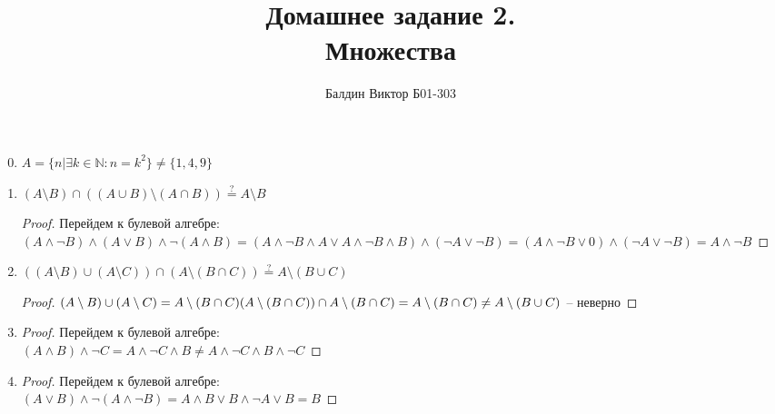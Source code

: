 \documentclass[12pt]{article}
\title{Домашнее задание 2. \\ Множества}
\author{Балдин Виктор Б01-303}
\begin{document}
    \maketitle

    \begin{enumerate}
        \setcounter{enumi}{-1}
        \item \( A = \{n|\exists k \in \mathbb N: n = k^2\} \neq \{
        1, 4, 9\} \)

        \item \( (A \setminus B) \cap ((A \cup B) \setminus (A \cap B)) \stackrel{?}{=}
         A \setminus B\)
        \begin{proof}
            Перейдем к булевой алгебре: \\
            \( (A \wedge \lnot B ) \wedge (A \vee B) \wedge \lnot(A \wedge B) =
            (A \wedge \lnot B \wedge A \vee A \wedge \lnot B \wedge B) \wedge
            (\lnot A \vee \lnot B) = (A \wedge \lnot B \vee 0) \wedge (\lnot A \vee
            \lnot B) = A \wedge \lnot B \)
        \end{proof}

        \item \( ((A \setminus B) \cup (A \setminus C)) \cap
        (A \setminus (B \cap C)) \stackrel{?}{=} A\setminus (B \cup C)\)
        \begin{proof}
            \( (A \setminus B) \cup (A \setminus C) = A \setminus
            (B \cap C) \\
            (A \setminus (B \cap C)) \cap A \setminus
            (B \cap C) = A \setminus
            (B \cap C) \neq A \setminus
            (B \cup C)\) -- неверно
        \end{proof}

        \item \begin{proof}
            Перейдем к булевой алгебре: \\
            \( (A \wedge B) \wedge \lnot C = A \wedge \lnot C \wedge B \neq A \wedge \lnot C \wedge B \wedge
            \lnot C \)
        \end{proof}

        \item \begin{proof}
            Перейдем к булевой алгебре: \\
            \( (A \vee B) \wedge \lnot (A \wedge \lnot B) = A \wedge
            B \vee B \wedge \lnot A \vee B = B \)
        \end{proof}


\end{enumerate}
\end{document}
